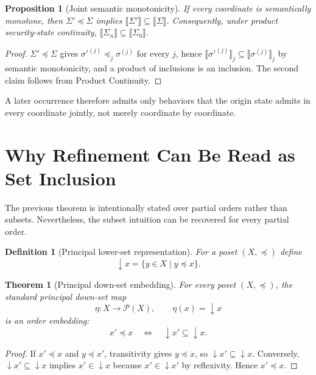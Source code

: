 \documentclass[10pt,twocolumn]{article}
\newcommand{\sem}[1]{\llbracket #1 \rrbracket}
\newcommand{\powerset}{\mathcal{P}}
\newcommand{\state}{\Sigma}
\newcommand{\coord}{\sigma}
\newtheorem{definition}{Definition}
\newtheorem{theorem}{Theorem}
\newtheorem{proposition}{Proposition}
\begin{document}
\begin{proposition}[Joint semantic monotonicity]\label{prop:joint}
If every coordinate is semantically monotone, then
$\state'\preceq\state$ implies $\sem{\state'}\subseteq\sem{\state}$.
Consequently, under product security-state continuity,
$\sem{\state_n}\subseteq\sem{\state_0}$.
\end{proposition}

\begin{proof}
$\state'\preceq\state$ gives $\coord'^{(j)}\preceq_j\coord^{(j)}$ for
every $j$, hence $\sem{\coord'^{(j)}}_j\subseteq\sem{\coord^{(j)}}_j$ by
semantic monotonicity, and a product of inclusions is an inclusion. The
second claim follows from Product Continuity.
\end{proof}

A later occurrence therefore admits only behaviors that the origin state
admits in every coordinate jointly, not merely coordinate by coordinate.

\section{Why Refinement Can Be Read as Set Inclusion}

The previous theorem is intentionally stated over partial orders rather than
subsets.  Nevertheless, the subset intuition can be recovered for every
partial order.

\begin{definition}[Principal lower-set representation]
For a poset $(X,\preceq)$ define
\begin{equation}
  \downarrow x
  =\{y\in X\mid y\preceq x\}.
\end{equation}
\end{definition}

\begin{theorem}[Principal down-set embedding]
For every poset $(X,\preceq)$, the standard principal down-set map
\begin{equation}
  \eta:X\to\powerset(X),
  \qquad
  \eta(x)=\downarrow x
\end{equation}
is an order embedding:
\begin{equation}
  x'\preceq x
  \quad\Longleftrightarrow\quad
  \downarrow x'\subseteq\downarrow x.
  \label{eq:downset-embedding}
\end{equation}
\end{theorem}

\begin{proof}
If $x'\preceq x$ and $y\preceq x'$, transitivity gives $y\preceq x$, so
$\downarrow x'\subseteq\downarrow x$.  Conversely,
$\downarrow x'\subseteq\downarrow x$ implies $x'\in\downarrow x$ because
$x'\in\downarrow x'$ by reflexivity.  Hence $x'\preceq x$.
\end{proof}
\end{document}
